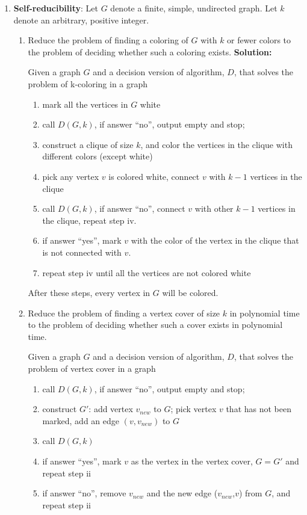 \documentclass{article}%
\begin{document}
\begin{enumerate}

	\item \textbf{Self-reducibility}: Let $G$ denote a finite, simple, undirected graph. Let $k$ denote an arbitrary, positive integer.
	\begin{enumerate}
	\item  Reduce the problem of finding a coloring of $G$ with $k$ or fewer colors to the problem of deciding whether such a coloring exists.
	\textbf{Solution:}
	
	Given a graph $G$ and a decision version of algorithm, $D$, that solves the problem of k-coloring in a graph\\
\begin{enumerate}
  \item mark all the vertices in $G$ white
	\item call $D(G,k)$, if answer ``no'', output empty and stop; 
	\item construct a clique of size $k$, and color the vertices in the clique with different colors (except white)
	\item pick any vertex $v$ is colored white, connect $v$ with $k-1$ vertices in the clique
	\item call $D(G,k)$, if answer ``no'', connect $v$ with other $k-1$ vertices in the clique, repeat step iv.
	\item if answer ``yes'', mark $v$ with the color of the vertex in the clique that is not connected with $v$. 
	\item repeat step iv until all the vertices are not colored white
\end{enumerate}

  After these steps, every vertex in $G$ will be colored.
	
	
	\item Reduce the problem of finding a vertex cover of size $k$ in polynomial time to the problem of deciding whether such a cover exists in polynomial time.
	
  Given a graph $G$ and a decision version of algorithm, $D$, that solves the problem of vertex cover in a graph\\
		
	\begin{enumerate}
	\item call $D(G,k)$, if answer ``no'', output empty and stop; 
	\item construct $G'$: add vertex $v_{new}$ to $G$; pick vertex $v$ that has not been marked, add an edge $(v,v_{new})$ to $G$
	\item call $D(G,k)$
	\item if answer ``yes'', mark $v$ as the vertex in the vertex cover, $G=G'$ and repeat step ii
	\item if answer ``no'', remove $v_{new}$ and the new edge ($v_{new}$,$v$) from $G$, and repeat step ii
\end{enumerate}
 

\end{enumerate}
\end{enumerate}
\end{document}
